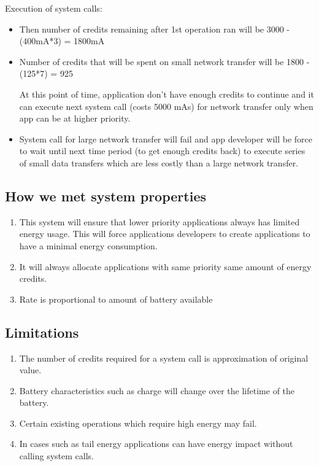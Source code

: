 Execution of system calls:

\begin{itemize}

\item Then number of credits remaining after 1st operation ran will be 3000 - (400mA*3) = 1800mA

\item Number of credits that will be spent on small network transfer will be 1800 - (125*7) = 925

At this point of time, application don't have enough credits to continue and it can execute next system call (costs 5000 mAs) for network transfer only when app can be at higher priority.

\item System call for large network transfer will fail and app developer will be force to wait until next time period (to get enough credits back) to execute series of small data transfers which are less costly than a large network transfer.

\end{itemize}

\subsection{How we met system properties}

\begin{enumerate}


\item  This system will ensure that lower priority applications always has limited energy usage. This will force applications developers to create applications to have a minimal energy consumption. 

\item  It will always allocate applications with same priority same amount of energy credits.

\item  Rate is proportional to amount of battery available 

\end{enumerate}

\subsection{Limitations}

\begin{enumerate}

\item  The number of credits required for a system call is approximation of original value.
\item  Battery characteristics such as charge will change over the lifetime of the battery. 
\item  Certain existing operations which require high energy may fail.
\item  In cases such as tail energy applications can have energy impact without calling system calls.

\end{enumerate}

